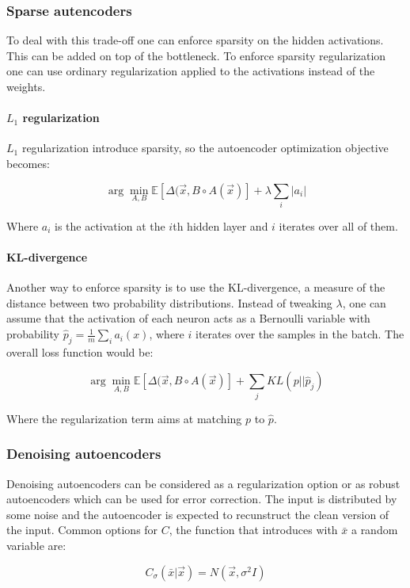 		\subsubsection{Sparse autencoders}
		To deal with this trade-off one can enforce sparsity on the hidden activations.
		This can be added on top of the bottleneck.
		To enforce sparsity regularization one can use ordinary regularization applied to the activations instead of the weights.

			\paragraph{$L_1$ regularization}
			$L_1$ regularization introduce sparsity, so the autoencoder optimization objective becomes:

			$$\arg\min\limits_{A,B}\mathbb{E}[\Delta(\vec{x}, B\circ A(\vec{x})] + \lambda\sum\limits_i|a_i|$$

			Where $a_i$ is the activation at the $i$th hidden layer and $i$ iterates over all of them.

			\paragraph{KL-divergence}
			Another way to enforce sparsity is to use the KL-divergence, a measure of the distance between two probability distributions.
			Instead of tweaking $\lambda$, one can assume that the activation of each neuron acts as a Bernoulli variable with probability $\hat{p}_j = \frac{1}{m}\sum\limits_ia_i(x)$, where $i$ iterates over the samples in the batch.
			The overall loss function would be:

			$$\arg\min\limits_{A,B}\mathbb{E}[\Delta(\vec{x}, B\circ A(\vec{x})] + \sum\limits_jKL(p||\hat{p}_j)$$

			Where the regularization term aims at matching $p$ to $\hat{p}$.

		\subsubsection{Denoising autoencoders}
		Denoising autoencoders can be considered as a regularization option or as robust autoencoders which can be used for error correction.
		The input is distributed by some noise and the autoencoder is expected to recunstruct the clean version of the input.
		Common options for $C$, the function that introduces with $\bar{x}$ a random variable are:

		$$C_\sigma(\bar{x}|\vec{x}) = N(\vec{x}, \sigma^2 I)$$

